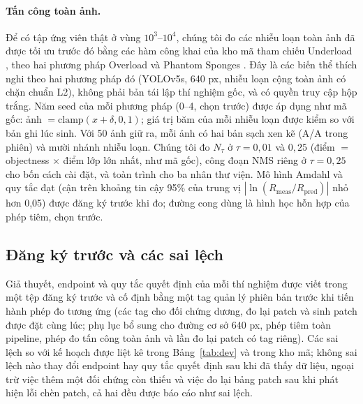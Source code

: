 \documentclass[12pt,a4paper]{article}
\newcommand{\Ntau}{N_{\tau}}
\begin{document}
\paragraph{Tấn công toàn ảnh.} Để có tập ứng viên thật ở vùng $10^3$--$10^4$, chúng tôi đo các nhiễu loạn toàn ảnh đã được tối ưu trước đó bằng các hàm công khai của kho mã tham chiếu Underload \cite{underload2025}, theo hai phương pháp Overload \cite{overload2024} và Phantom Sponges \cite{phantom2023}. Đây là các biến thể thích nghi theo hai phương pháp đó (YOLOv5s, 640 px, nhiễu loạn cộng toàn ảnh có chặn chuẩn L2), không phải bản tái lập thí nghiệm gốc, và có quyền truy cập hộp trắng. Năm seed của mỗi phương pháp (0--4, chọn trước) được áp dụng như mã gốc: ảnh $=\mathrm{clamp}(x+\delta,0,1)$; giá trị băm của mỗi nhiễu loạn được kiểm so với bản ghi lúc sinh. Với 50 ảnh giữ ra, mỗi ảnh có hai bản sạch xen kẽ (A/A trong phiên) và mười nhánh nhiễu loạn. Chúng tôi đo $\Ntau$ ở $\tau=0{,}01$ và $0{,}25$ (điểm $=$ objectness $\times$ điểm lớp lớn nhất, như mã gốc), công đoạn NMS riêng ở $\tau=0{,}25$ cho bốn cách cài đặt, và toàn trình cho ba nhân thư viện. Mô hình Amdahl và quy tắc đạt (cận trên khoảng tin cậy 95\% của trung vị $|\ln(R_{\mathrm{meas}}/R_{\mathrm{pred}})|$ nhỏ hơn 0,05) được đăng ký trước khi đo; đường cong dùng là hình học hỗn hợp của phép tiêm, chọn trước.

\subsection{Đăng ký trước và các sai lệch}
Giả thuyết, endpoint và quy tắc quyết định của mỗi thí nghiệm được viết trong một tệp đăng ký trước và cố định bằng một tag quản lý phiên bản trước khi tiến hành phép đo tương ứng (các tag cho đối chứng dương, đo lại patch và sinh patch được đặt cùng lúc; phụ lục bổ sung cho đường cơ sở 640 px, phép tiêm toàn pipeline, phép đo tấn công toàn ảnh và lần đo lại patch có tag riêng). Các sai lệch so với kế hoạch được liệt kê trong Bảng~\ref{tab:dev} và trong kho mã; không sai lệch nào thay đổi endpoint hay quy tắc quyết định sau khi đã thấy dữ liệu, ngoại trừ việc thêm một đối chứng còn thiếu và việc đo lại bảng patch sau khi phát hiện lỗi chèn patch, cả hai đều được báo cáo như sai lệch.
\end{document}
